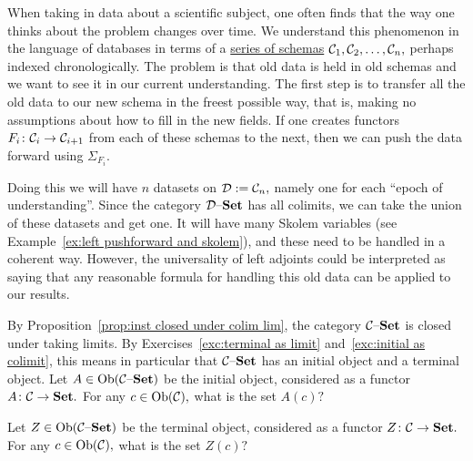 \documentclass[CT4S-EN-RU]{subfiles}
\begin{document}
\begin{proofRUS}
\end{proofRUS}

\begin{applicationENG}
When taking in data about a scientific subject, one often finds that the way one thinks about the problem changes over time. We understand this phenomenon in the language of databases in terms of a \href{http://en.wikipedia.org/wiki/Schema_evolution}{\text series of schemas} $\mathcal{C}_1,\mathcal{C}_2,\ldots,\mathcal{C}_n,$ perhaps indexed chronologically. The problem is that old data is held in old schemas and we want to see it in our current understanding. The first step is to transfer all the old data to our new schema in the freest possible way, that is, making no assumptions about how to fill in the new fields. If one creates functors $F_i\colon\mathcal{C}_i\rightarrow\mathcal{C}_{i+1}$ from each of these schemas to the next, then we can push the data forward using $\Sigma_{F_i}.$ 

Doing this we will have $n$ datasets on $\mathcal{D}:=\mathcal{C}_n,$ namely one for each “epoch of understanding”. Since the category $\mathcal{D}{\text \textendash}{\mathbf{Set}}$ has all colimits, we can take the union of these datasets and get one. It will have many Skolem variables (see Example~\ref{ex:left pushforward and skolem}), and these need to be handled in a coherent way. However, the universality of left adjoints could be interpreted as saying that any reasonable formula for handling this old data can be applied to our results.
\end{applicationENG}

\begin{applicationRUS}
\end{applicationRUS}

\begin{exerciseENG}\label{exc:universal objects in C-set}
By Proposition~\ref{prop:inst closed under colim lim}, the category $\mathcal{C}{\text \textendash}{\mathbf{Set}}$ is closed under taking limits. By Exercises~\ref{exc:terminal as limit} and~\ref{exc:initial as colimit}, this means in particular that $\mathcal{C}{\text \textendash}{\mathbf{Set}}$ has an initial object and a terminal object. 
\sexc Let $A\in\operatorname{Ob}(\mathcal{C}{\text \textendash}{\mathbf{Set}})$ be the initial object, considered as a functor $A\colon\mathcal{C}\rightarrow{\mathbf{Set}}.$ For any $c\in\operatorname{Ob}(\mathcal{C}),$ what is the set $A(c)?$
\item Let $Z\in\operatorname{Ob}(\mathcal{C}{\text \textendash}{\mathbf{Set}})$ be the terminal object, considered as a functor $Z\colon\mathcal{C}\rightarrow{\mathbf{Set}}.$ For any $c\in\operatorname{Ob}(\mathcal{C}),$ what is the set $Z(c)?$
\endsexc
\end{exerciseENG}
\end{document}
